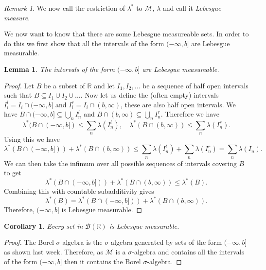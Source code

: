 \documentclass[11pt]{article}
\newtheorem{cor}[thm]{Corollary}
\newtheorem{lem}[thm]{Lemma}
\theoremstyle{definition}
\theoremstyle{remark}
\newtheorem{remark}[thm]{Remark}
\begin{document}
\begin{remark}
We now call the restriction of $\lambda^*$ to $\mathscr{M}$, $\lambda$ and call it \emph{Lebesgue measure}.
\end{remark}

We now want to know that there are some Lebesgue measureable sets. In order to do this we first show that all the intervals of the form $(-\infty, b]$ are Lebesgue measurable.

\begin{lem}
The intervals of the form $(-\infty, b]$ are Lebesgue measureable.
\end{lem}
\begin{proof}
Let $B$ be a subset of $\mathbb{R}$ and let $I_1, I_2, \dots$ be a sequence of half open intervals such that $B \subseteq I_1 \cup I_2 \cup \dots$. Now let us define the (often empty) intervals $I^l_i = I_i \cap (-\infty, b]$ and $I^r_i = I_i \cap (b, \infty)$, these are also half open intervals. We have $B \cap (-\infty,b] \subseteq \bigcup_n I^l_n$ and $B \cap (b,\infty) \subseteq \bigcup_n I^r_n$. Therefore we have
\[ \lambda^*(B \cap (-\infty, b]) \leq \sum_n \lambda(I^l_n), \quad \lambda^*(B \cap (b,\infty)) \leq \sum_n \lambda(I^r_n). \] Using this we have
\[ \lambda^*(B \cap(-\infty,b])) + \lambda^*(B \cap (b,\infty)) \leq \sum_n \lambda(I^l_n) + \sum_n \lambda(I^r_n) = \sum_n \lambda(I_n).\] We can then take the infimum over all possible sequences of intervals covering $B$ to get
\[ \lambda^*(B \cap(-\infty,b])) + \lambda^*(B \cap (b,\infty)) \leq \lambda^*(B). \] Combining this with countable subadditivity gives
\[ \lambda^*(B) = \lambda^*(B \cap(-\infty,b])) + \lambda^*(B \cap (b,\infty)). \] Therefore, $(-\infty,b]$ is Lebesgue measurable.
\end{proof}

\begin{cor}
Every set in $\mathcal{B}(\mathbb{R})$ is Lebesgue measurable.
\end{cor}
\begin{proof}
The Borel $\sigma$ algebra is the $\sigma$ algebra generated by sets of the form $(-\infty, b]$ as shown last week. Therefore, as $\mathscr{M}$ is a $\sigma$-algebra and contains all the intervals of the form $(-\infty, b]$ then it contains the Borel $\sigma$-algebra.
\end{proof}
\end{document}

